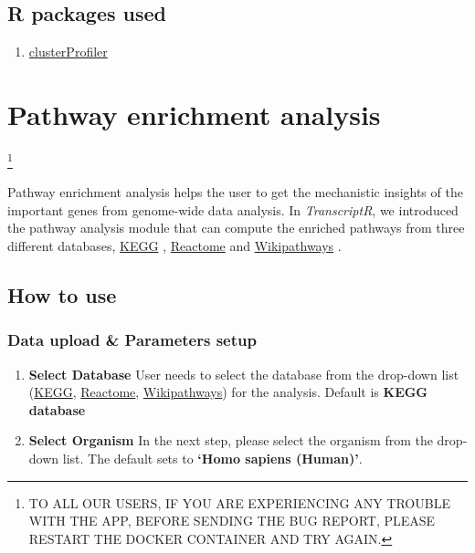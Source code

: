 \documentclass[
  a4paper,
  DIV=11,
  numbers=noendperiod,
  oneside,
  open=any]{scrreport}
\providecommand{\tightlist}{%
  \setlength{\itemsep}{0pt}\setlength{\parskip}{0pt}}\usepackage{longtable,booktabs,array}
\begin{document}
\section{R packages used}\label{r-packages-used-2}

\begin{enumerate}
\def\labelenumi{\arabic{enumi}.}
\tightlist
\item
  \href{https://bioconductor.org/packages/release/bioc/vignettes/clusterProfiler/inst/doc/clusterProfiler.html}{clusterProfiler}
\end{enumerate}

\chapter{Pathway enrichment analysis}\label{sec-pathway}

\footnote{TO ALL OUR USERS, IF YOU ARE EXPERIENCING ANY TROUBLE WITH THE
  APP, BEFORE SENDING THE BUG REPORT, PLEASE RESTART THE DOCKER
  CONTAINER AND TRY AGAIN.}

Pathway enrichment analysis helps the user to get the mechanistic
insights of the important genes from genome-wide data analysis. In
\emph{TranscriptR}, we introduced the pathway analysis module that can
compute the enriched pathways from three different databases,
\href{https://www.genome.jp/kegg/}{KEGG} \autocite{Kanehisa2000},
\href{https://reactome.org/}{Reactome} \autocite{Gillespie2021} and
\href{https://www.wikipathways.org/}{Wikipathways}
\autocite{pico2008plos,martens2020nar}.

\section{How to use}\label{how-to-use-5}

\subsection{Data upload \& Parameters
setup}\label{data-upload-parameters-setup-1}

\begin{enumerate}
\def\labelenumi{\arabic{enumi}.}
\item
  \textbf{Select Database} User needs to select the database from the
  drop-down list (\href{https://www.genome.jp/kegg/}{KEGG},
  \href{https://reactome.org/}{Reactome},
  \href{https://www.wikipathways.org/}{Wikipathways}) for the analysis.
  Default is \textbf{KEGG database}
\item
  \textbf{Select Organism} In the next step, please select the organism
  from the drop-down list. The default sets to \textbf{`Homo sapiens
  (Human)'}.
\end{enumerate}
\end{document}
